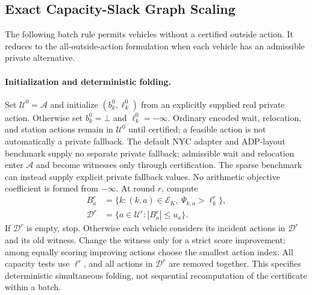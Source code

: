 \subsection{Exact Capacity-Slack Graph Scaling}
\label{app:proof_additional}
The following batch rule permits vehicles without a certified outside
action. It reduces to the all-outside-action formulation when each
vehicle has an admissible private alternative.

\paragraph{Initialization and deterministic folding.}
Set $\mathcal U^0=\mathcal A$ and initialize
$(b_k^0,\ell_k^0)$ from an explicitly supplied real private action.
Otherwise set $b_k^0=\bot$ and $\ell_k^0=-\infty$. Ordinary encoded
wait, relocation, and station actions remain in $\mathcal U^0$ until
certified; a feasible action is not automatically a private fallback.
The default NYC adapter and ADP-layout benchmark supply no separate
private fallback: admissible wait and relocation enter $\mathcal A$
and become witnesses only through certification. The sparse benchmark
can instead supply explicit private fallback values.
No arithmetic objective coefficient is formed from $-\infty$.
At round $r$, compute
\begin{equation}
\begin{aligned}
B_a^r&=\{k:(k,a)\in\mathcal E_K,\ \Psi_{k,a}>\ell_k^r\},\\
\mathcal D^r&=\{a\in\mathcal U^r:|B_a^r|\le u_a\}.
\end{aligned}
\label{eq:batch_fold_sets}
\end{equation}
If $\mathcal D^r$ is empty, stop. Otherwise each vehicle considers
its incident actions in $\mathcal D^r$ and its old witness. Change the
witness only for a strict score improvement; among equally scoring
improving actions choose the smallest action index. All capacity tests
use $\ell^r$, and all actions in $\mathcal D^r$ are removed together.
This specifies deterministic simultaneous folding, not sequential
recomputation of the certificate within a batch.

